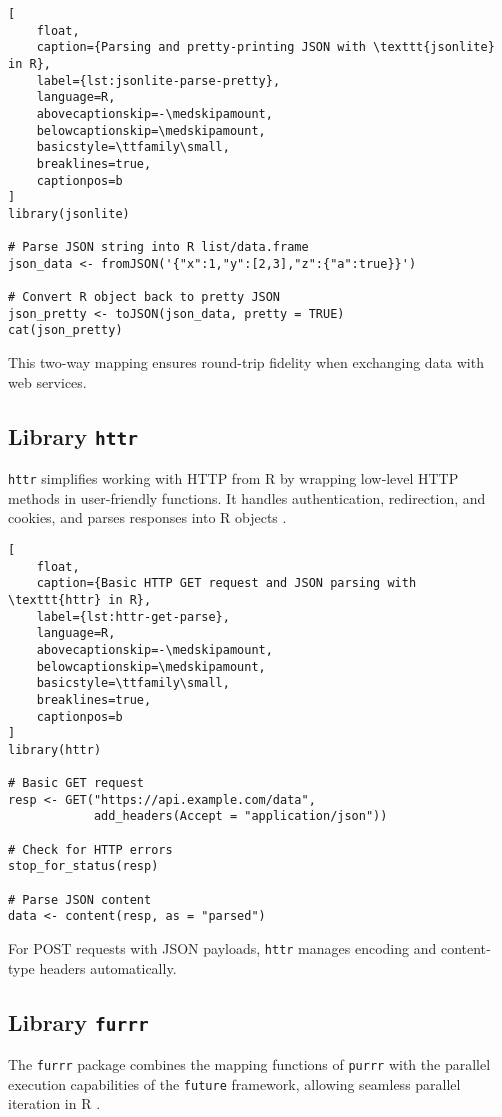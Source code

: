 \begin{lstlisting}[
    float,
    caption={Parsing and pretty-printing JSON with \texttt{jsonlite} in R},
    label={lst:jsonlite-parse-pretty},
    language=R,
    abovecaptionskip=-\medskipamount,
    belowcaptionskip=\medskipamount,
    basicstyle=\ttfamily\small,
    breaklines=true,
    captionpos=b
]
library(jsonlite)

# Parse JSON string into R list/data.frame
json_data <- fromJSON('{"x":1,"y":[2,3],"z":{"a":true}}')

# Convert R object back to pretty JSON
json_pretty <- toJSON(json_data, pretty = TRUE)
cat(json_pretty)
\end{lstlisting}


This two-way mapping ensures round-trip fidelity when exchanging data with web services.

\subsection{Library \texttt{httr}}

\texttt{httr} simplifies working with HTTP from R by wrapping low‐level HTTP methods in user-friendly functions. It handles authentication, redirection, and cookies, and parses responses into R objects \cite{wickham2011httr}.

\begin{lstlisting}[
    float,
    caption={Basic HTTP GET request and JSON parsing with \texttt{httr} in R},
    label={lst:httr-get-parse},
    language=R,
    abovecaptionskip=-\medskipamount,
    belowcaptionskip=\medskipamount,
    basicstyle=\ttfamily\small,
    breaklines=true,
    captionpos=b
]
library(httr)

# Basic GET request
resp <- GET("https://api.example.com/data",
            add_headers(Accept = "application/json"))

# Check for HTTP errors
stop_for_status(resp)

# Parse JSON content
data <- content(resp, as = "parsed")
\end{lstlisting}


For POST requests with JSON payloads, \texttt{httr} manages encoding and content‐type headers automatically.

\subsection{Library \texttt{furrr}}

The \texttt{furrr} package combines the mapping functions of \texttt{purrr} with the parallel execution capabilities of the \texttt{future} framework, allowing seamless parallel iteration in R \cite{Vaughan2020furrr}.

